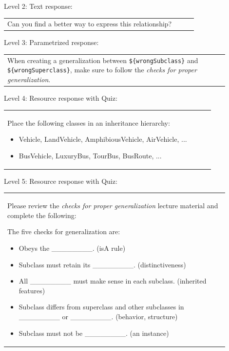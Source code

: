 \noindent Level 2: Text response: \medskip

\begin{tabular}{|p{0.9\linewidth}}
Can you find a better way to express this relationship?
\end{tabular} \medskip

\noindent Level 3: Parametrized response: \medskip

\begin{tabular}{|p{0.9\linewidth}}
When creating a generalization between \verb|${wrongSubclass}| and \verb|${wrongSuperclass}|, make sure to follow the \textit{checks for proper generalization}.
\end{tabular} \medskip

\noindent Level 4: Resource response with Quiz: \medskip

\begin{tabular}{|p{0.9\linewidth}}
Place the following classes in an inheritance hierarchy:

\begin{itemize}
    \item Vehicle, LandVehicle, AmphibiousVehicle, AirVehicle, ...
    \item BusVehicle, LuxuryBus, TourBus, BusRoute, ...
\end{itemize}

\end{tabular} \medskip

\noindent Level 5: Resource response with Quiz: \medskip

\begin{tabular}{|p{0.9\linewidth}}
Please review the \textit{checks for proper generalization} lecture material
and complete the following:

The five checks for generalization are:
\begin{itemize}
    \item Obeys the \_\_\_\_\_\_\_\_. (isA rule)
    \item Subclass must retain its \_\_\_\_\_\_\_\_. (distinctiveness)
    \item All \_\_\_\_\_\_\_\_ must make sense in each subclass. (inherited features)
    \item Subclass differs from superclass and other subclasses in \_\_\_\_\_\_\_\_ or \_\_\_\_\_\_\_\_. (behavior, structure)
    \item Subclass must not be \_\_\_\_\_\_\_\_. (an instance)
\end{itemize}

\end{tabular} \medskip

